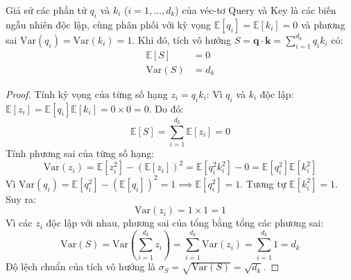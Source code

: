 \begin{theorem}
Giả sử các phần tử $q_i$ và $k_i$ ($i = 1, \dots, d_k$) của véc-tơ Query và Key là các biến ngẫu nhiên độc lập, cùng phân phối với kỳ vọng $\mathbb{E}[q_i] = \mathbb{E}[k_i] = 0$ và phương sai $\text{Var}(q_i) = \text{Var}(k_i) = 1$.
Khi đó, tích vô hướng $S = \mathbf{q} \cdot \mathbf{k} = \sum_{i=1}^{d_k} q_i k_i$ có:
\begin{align}
\mathbb{E}[S] &= 0 \\
\text{Var}(S) &= d_k
\end{align}
\end{theorem}

\begin{proof}
Tính kỳ vọng của từng số hạng $z_i = q_i k_i$:
Vì $q_i$ và $k_i$ độc lập: $\mathbb{E}[z_i] = \mathbb{E}[q_i] \mathbb{E}[k_i] = 0 \times 0 = 0$.
Do đó:
\begin{equation}
\mathbb{E}[S] = \sum_{i=1}^{d_k} \mathbb{E}[z_i] = 0
\end{equation}
Tính phương sai của từng số hạng:
\begin{equation}
\text{Var}(z_i) = \mathbb{E}[z_i^2] - (\mathbb{E}[z_i])^2 = \mathbb{E}[q_i^2 k_i^2] - 0 = \mathbb{E}[q_i^2] \mathbb{E}[k_i^2]
\end{equation}
Vì $\text{Var}(q_i) = \mathbb{E}[q_i^2] - (\mathbb{E}[q_i])^2 = 1 \implies \mathbb{E}[q_i^2] = 1$. Tương tự $\mathbb{E}[k_i^2] = 1$.
Suy ra:
\begin{equation}
\text{Var}(z_i) = 1 \times 1 = 1
\end{equation}
Vì các $z_i$ độc lập với nhau, phương sai của tổng bằng tổng các phương sai:
\begin{equation}
\text{Var}(S) = \text{Var}\left(\sum_{i=1}^{d_k} z_i\right) = \sum_{i=1}^{d_k} \text{Var}(z_i) = \sum_{i=1}^{d_k} 1 = d_k
\end{equation}
Độ lệch chuẩn của tích vô hướng là $\sigma_S = \sqrt{\text{Var}(S)} = \sqrt{d_k}$.
\end{proof}

